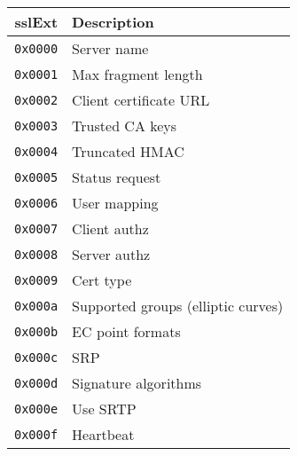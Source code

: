 \documentclass[documentation]{subfiles}
\begin{document}
\begin{minipage}{0.48\textwidth}
    \begin{longtable}{rl}
        \toprule
        {\bf sslExt} & {\bf Description}\\
        \midrule\endhead%
        {\tt 0x0000} & Server name\\
        {\tt 0x0001} & Max fragment length\\
        {\tt 0x0002} & Client certificate URL\\
        {\tt 0x0003} & Trusted CA keys\\
        {\tt 0x0004} & Truncated HMAC\\
        {\tt 0x0005} & Status request\\
        {\tt 0x0006} & User mapping\\
        {\tt 0x0007} & Client authz\\
        {\tt 0x0008} & Server authz\\
        {\tt 0x0009} & Cert type\\
        {\tt 0x000a} & Supported groups (elliptic curves)\\
        {\tt 0x000b} & EC point formats\\
        {\tt 0x000c} & SRP\\
        {\tt 0x000d} & Signature algorithms\\
        {\tt 0x000e} & Use SRTP\\
        {\tt 0x000f} & Heartbeat\\
        \bottomrule
    \end{longtable}
\end{minipage}
\hfill
\end{document}
